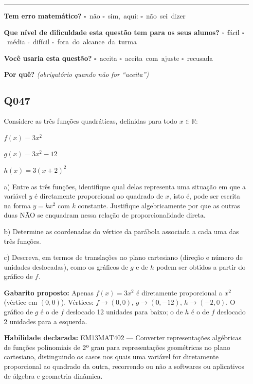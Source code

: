 \documentclass[11pt,a4paper]{article}
\begin{document}
\noindent\rule{\linewidth}{0.4pt}
\textbf{Tem erro matemático?}\quad
\mbox{$\square$~não} \quad \mbox{$\square$~sim, aqui:} \underline{\hspace{5cm}}
\quad \mbox{$\square$~não sei dizer}

\textbf{Que nível de dificuldade esta questão tem para os seus alunos?}\quad
\mbox{$\square$~fácil} \quad \mbox{$\square$~média} \quad
\mbox{$\square$~difícil} \quad \mbox{$\square$~fora do alcance da turma}

\textbf{Você usaria esta questão?}\quad
\mbox{$\square$~aceita} \quad \mbox{$\square$~aceita com ajuste} \quad
\mbox{$\square$~recusada}

\textbf{Por quê?} \emph{(obrigatório quando não for ``aceita'')}

\underline{\hspace{\linewidth}}

\underline{\hspace{\linewidth}}
\vspace{0.6em}

\begin{samepage}
\subsection*{Q047}
Considere as três funções quadráticas, definidas para todo $x \in \mathbb{R}$:

$f(x) = 3x^2$

$g(x) = 3x^2 - 12$

$h(x) = 3(x+2)^2$

a) Entre as três funções, identifique qual delas representa uma situação em que a variável $y$ é diretamente proporcional ao quadrado de $x$, isto é, pode ser escrita na forma $y = kx^2$ com $k$ constante. Justifique algebricamente por que as outras duas NÃO se enquadram nessa relação de proporcionalidade direta.

b) Determine as coordenadas do vértice da parábola associada a cada uma das três funções.

c) Descreva, em termos de translações no plano cartesiano (direção e número de unidades deslocadas), como os gráficos de $g$ e de $h$ podem ser obtidos a partir do gráfico de $f$.

\textbf{Gabarito proposto:} Apenas $f(x)=3x^2$ é diretamente proporcional a $x^2$ (vértice em $(0,0)$). Vértices: $f\to(0,0)$, $g\to(0,-12)$, $h\to(-2,0)$. O gráfico de $g$ é o de $f$ deslocado 12 unidades para baixo; o de $h$ é o de $f$ deslocado 2 unidades para a esquerda.

\textbf{Habilidade declarada:} EM13MAT402 --- Converter representações algébricas de funções polinomiais de 2º grau para representações geométricas no plano cartesiano, distinguindo os casos nos quais uma variável for diretamente proporcional ao quadrado da outra, recorrendo ou não a softwares ou aplicativos de álgebra e geometria dinâmica.
\end{samepage}
\end{document}
